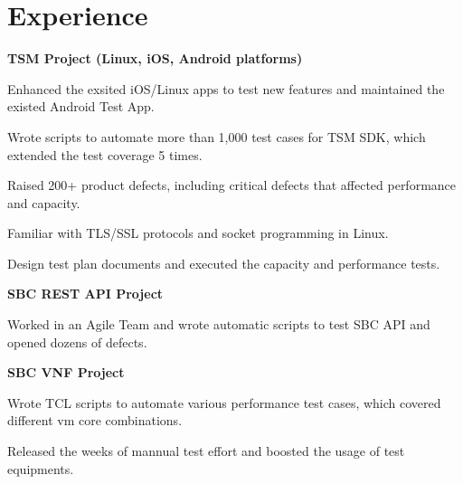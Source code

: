 \documentclass[a4paper]{lyu-resume} %
\begin{document}
\hfill
%
%
\begin{minipage}[t]{0.66\textwidth} %
\section{Experience}
\textbf{TSM Project (Linux, iOS, Android platforms)}
\vspace{\topsep} %
\begin{tightitemize}
\item Enhanced the exsited iOS/Linux apps to test new features and maintained the existed Android Test App.
\item Wrote scripts to automate more than 1,000 test cases for TSM SDK, which extended the test coverage 5 times. 
\item Raised 200+ product defects, including critical defects that affected performance and capacity.
\item Familiar with TLS/SSL protocols and socket programming in Linux.
\item Design test plan documents and executed the capacity and performance tests.
\end{tightitemize}

\vspace{\topsep} %
\textbf{SBC REST API Project}
\begin{tightitemize}
\item Worked in an Agile Team and wrote automatic scripts to test SBC API and opened dozens of defects.
\end{tightitemize}

\vspace{\topsep} %
\textbf{SBC VNF Project}
\begin{tightitemize}
\item Wrote TCL scripts to automate various performance test cases, which covered different vm core combinations.
\item Released the weeks of mannual test effort and boosted the usage of test equipments.
\end{tightitemize}
\sectionspace %


\end{minipage}
\end{document}
